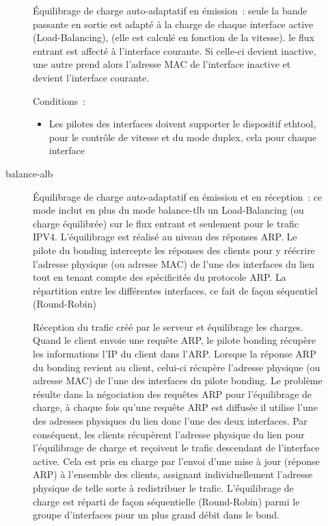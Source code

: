 \begin{description}
\begin{description}
  Équilibrage de charge auto-adaptatif en émission~: seule la bande passante en
  sortie est adapté à la charge de chaque interface active (Load-Balancing), (elle
  est calculé en fonction de la vitesse). le flux entrant est affecté à l'interface
  courante. Si celle-ci devient inactive, une autre prend alors l'adresse MAC de l'interface
  inactive et devient l'interface courante.

  Conditions~:
  \begin{itemize}

    \item Les pilotes des interfaces doivent supporter le dispositif ethtool, pour
          le contrôle de vitesse et du mode duplex, cela pour chaque interface
  \end{itemize}

\item [balance-alb]

  Équilibrage de charge auto-adaptatif en émission et en réception~: ce mode
  inclut en plus du mode balance-tlb un Load-Balancing (ou charge équilibrée)
  sur le flux entrant et seulement pour le trafic IPV4. L'équilibrage est réalisé
  au niveau des réponses ARP. Le pilote du bonding intercepte les réponses des clients
  pour y réécrire l'adresse physique (ou adresse MAC) de l'une des interfaces du lien
  tout en tenant compte des spécificités du protocole ARP. La répartition entre
  les différentes interfaces, ce fait de façon séquentiel (Round-Robin)

  Réception du trafic créé par le serveur et équilibrage les charges. Quand le
  client envoie une requête ARP, le pilote bonding récupère les informations
  l'IP du client dans l'ARP. Lorsque la réponse ARP du bonding revient au client,
  celui-ci récupère l'adresse physique (ou adresse MAC) de l'une des interfaces
  du pilote bonding. Le problème résulte dans la négociation des requêtes ARP pour
  l'équilibrage de charge, à chaque fois qu'une requête ARP est diffusée il utilise
  l'une des adresses physiques du lien donc l'une des deux interfaces. Par conséquent,
  les clients récupèrent l'adresse physique du lien pour l'équilibrage de charge et
  reçoivent le trafic descendant de l'interface active. Cela est pris en charge par
  l'envoi d'une mise à jour (réponse ARP) à l'ensemble des clients, assignant
  individuellement l'adresse physique de telle sorte à redistribuer le trafic.
  L'équilibrage de charge est réparti de façon séquentielle (Round-Robin) parmi le
  groupe d'interfaces pour un plus grand débit dans le bond.


\end{description}
\end{description}
